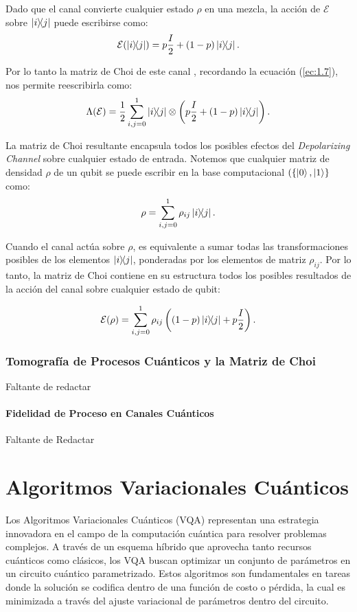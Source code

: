 \documentclass[11pt, spanish, letterpage]{report} %
\newcommand{\1}{\mathbb{1}}
\newcounter{problem}[section]
\begin{document}
Dado que el canal  convierte cualquier estado $\rho$ en una mezcla, la acción de $\mathcal{E}$ sobre $\ketbra{i}{j}$ puede escribirse como:
\begin{equation}
\mathcal{E}(\ketbra{i}{j}) = p \frac{I}{2}+ (1 - p) \ketbra{i}{j}.
\end{equation}

Por lo tanto la matriz de  Choi de este canal , recordando la ecuación (\ref{ec:1.7}), nos permite reescribirla  como:
\begin{equation}
\Lambda(\mathcal{E}) = \frac{1}{2} \sum_{i,j=0}^{1} \ketbra{i}{j} \otimes \left( p \frac{I}{2} +  (1-p) \ketbra{i}{j}  \right).
\end{equation}

La matriz de Choi resultante encapsula todos los posibles efectos del \textit{Depolarizing Channel} sobre cualquier estado de entrada. 
Notemos que cualquier matriz de densidad $\rho$ de un qubit se puede escribir en la base computacional $(\{\ket{0}, \ket{1} \}$ como:
\begin{equation}
\rho = \sum_{i,j=0}^{1} \rho_{ij}\ketbra{i}{j}.
\end{equation}

Cuando el canal actúa sobre $\rho$, es equivalente a sumar todas las transformaciones posibles de los elementos $\ketbra{i}{j}$, ponderadas por los elementos de matriz $\rho_{ij}$. Por lo tanto, la matriz de Choi contiene en su estructura todos los posibles resultados de la acción del canal sobre cualquier estado de qubit:

\begin{equation}
\mathcal{E}(\rho) = \sum_{i,j=0}^{1} \rho_{ij} \left( (1-p) \ketbra{i}{j} + p \frac{I}{2} \right).
\end{equation}

\subsection{Tomografía de Procesos Cuánticos y la Matriz de Choi}
Faltante de redactar
\subsubsection{Fidelidad de Proceso en Canales Cuánticos}
Faltante de Redactar



\chapter{Algoritmos Variacionales Cuánticos}
Los Algoritmos Variacionales Cuánticos (VQA) representan una estrategia innovadora en el campo de la computación cuántica para resolver problemas complejos. A través de un esquema híbrido que aprovecha tanto recursos cuánticos como clásicos, los VQA buscan optimizar un conjunto de parámetros en un circuito cuántico parametrizado. Estos algoritmos son fundamentales en tareas donde la solución se codifica dentro de una función de costo o pérdida, la cual es minimizada a través del ajuste variacional de parámetros dentro del circuito.
\end{document}
